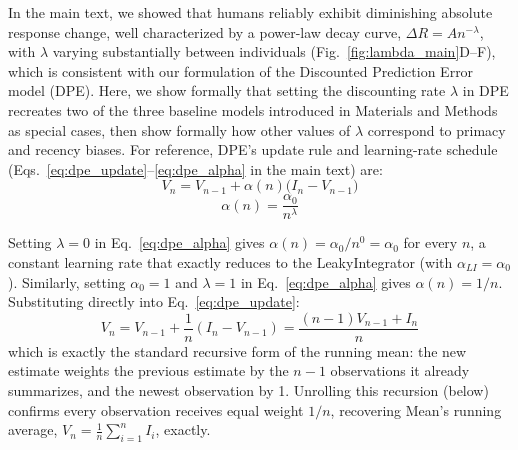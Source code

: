 \documentclass[12pt]{article}
\begin{document}
In the main text, we showed that humans reliably exhibit diminishing absolute response change, well characterized by a power-law decay curve, $\Delta R = A n^{-\lambda}$, with $\lambda$ varying substantially between individuals (Fig.~\ref{fig:lambda_main}D--F), which is consistent with our formulation of the Discounted Prediction Error model (DPE). Here, we show formally that setting the discounting rate $\lambda$ in DPE recreates two of the three baseline models introduced in Materials and Methods as special cases, then show formally how other values of $\lambda$ correspond to primacy and recency biases. For reference, DPE's update rule and learning-rate schedule (Eqs.~\ref{eq:dpe_update}--\ref{eq:dpe_alpha} in the main text) are:
\begin{equation*}
    V_n = V_{n-1} + \alpha(n) \bigl(I_n - V_{n-1}\bigr)
\end{equation*}
\begin{equation*}
    \alpha(n) = \frac{\alpha_0}{n^\lambda}
\end{equation*}

Setting $\lambda=0$ in Eq.~\ref{eq:dpe_alpha} gives $\alpha(n) = \alpha_0/n^0 = \alpha_0$ for every $n$, a constant learning rate that exactly reduces to the LeakyIntegrator (with $\alpha_{LI}=\alpha_0$). Similarly, setting $\alpha_0=1$ and $\lambda=1$ in Eq.~\ref{eq:dpe_alpha} gives $\alpha(n)=1/n$. Substituting directly into Eq.~\ref{eq:dpe_update}:
\begin{equation}
V_n = V_{n-1} + \frac1n(I_n - V_{n-1}) = \frac{(n-1)V_{n-1} + I_n}{n}
\end{equation}
which is exactly the standard recursive form of the running mean: the new estimate weights the previous estimate by the $n-1$ observations it already summarizes, and the newest observation by 1. Unrolling this recursion (below) confirms every observation receives equal weight $1/n$, recovering Mean's running average, $V_n = \tfrac1n\sum_{i=1}^n I_i$, exactly.
\end{document}
